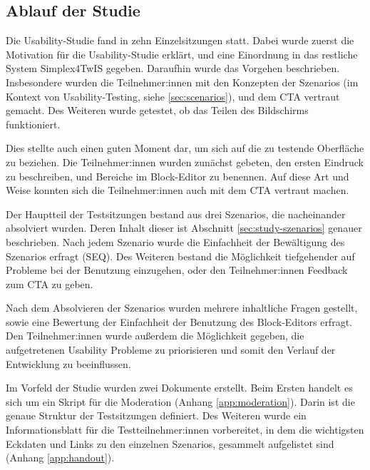 \subsection{Ablauf der Studie}

Die Usability-Studie fand in zehn Einzelsitzungen statt. Dabei wurde zuerst die Motivation für die Usability-Studie erklärt, und eine Einordnung in das restliche System Simplex4TwIS gegeben. Daraufhin wurde das Vorgehen beschrieben. Insbesondere wurden die Teilnehmer:innen mit den Konzepten der Szenarios (im Kontext von Usability-Testing, siehe \ref{sec:scenarios}), und dem \ac{CTA} vertraut gemacht. Des Weiteren wurde getestet, ob das Teilen des Bildschirms funktioniert.

Dies stellte auch einen guten Moment dar, um sich auf die zu testende Oberfläche zu beziehen. Die Teilnehmer:innen wurden zunächst gebeten, den ersten Eindruck zu beschreiben, und Bereiche im Block-Editor zu benennen. Auf diese Art und Weise konnten sich die Teilnehmer:innen auch mit dem \ac{CTA} vertraut machen.

Der Hauptteil der Testsitzungen bestand aus drei Szenarios, die nacheinander absolviert wurden. Deren Inhalt dieser ist Abschnitt \ref{sec:study-szenarios} genauer beschrieben. Nach jedem Szenario wurde die Einfachheit der Bewältigung des Szenarios erfragt (\ac{SEQ}). Des Weiteren bestand die Möglichkeit tiefgehender auf Probleme bei der Benutzung einzugehen, oder den Teilnehmer:innen Feedback zum \ac{CTA} zu geben.

Nach dem Absolvieren der Szenarios wurden mehrere inhaltliche Fragen gestellt, sowie eine Bewertung der Einfachheit der Benutzung des Block-Editors erfragt. Den Teilnehmer:innen wurde außerdem die Möglichkeit gegeben, die aufgetretenen Usability Probleme zu priorisieren und somit den Verlauf der Entwicklung zu beeinflussen.

Im Vorfeld der Studie wurden zwei Dokumente erstellt. Beim Ersten handelt es sich um ein Skript für die Moderation (Anhang \ref{app:moderation}). Darin ist die genaue Struktur der Testsitzungen definiert. Des Weiteren wurde ein Informationsblatt für die Testteilnehmer:innen vorbereitet, in dem die wichtigsten Eckdaten und Links zu den einzelnen Szenarios, gesammelt aufgelistet sind (Anhang \ref{app:handout}).
